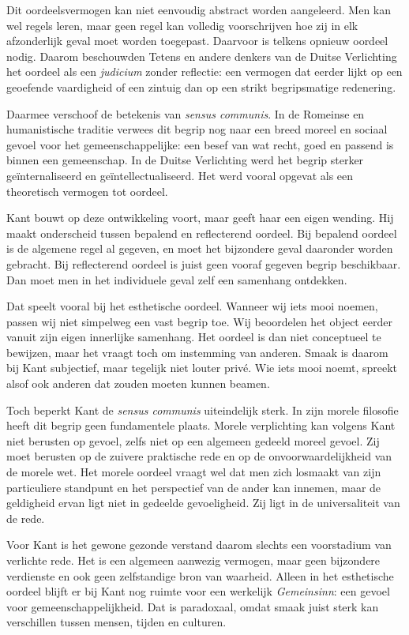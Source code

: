 \documentclass[11pt,twoside,openright]{memoir}
\begin{document}
Dit oordeelsvermogen kan niet eenvoudig abstract worden aangeleerd. Men kan wel regels leren, maar geen regel kan volledig voorschrijven hoe zij in elk afzonderlijk geval moet worden toegepast. Daarvoor is telkens opnieuw oordeel nodig. Daarom beschouwden Tetens en andere denkers van de Duitse Verlichting het oordeel als een \textit{judicium} zonder reflectie: een vermogen dat eerder lijkt op een geoefende vaardigheid of een zintuig dan op een strikt begripsmatige redenering.

Daarmee verschoof de betekenis van \textit{sensus communis}. In de Romeinse en humanistische traditie verwees dit begrip nog naar een breed moreel en sociaal gevoel voor het gemeenschappelijke: een besef van wat recht, goed en passend is binnen een gemeenschap. In de Duitse Verlichting werd het begrip sterker geïnternaliseerd en geïntellectualiseerd. Het werd vooral opgevat als een theoretisch vermogen tot oordeel.

Kant bouwt op deze ontwikkeling voort, maar geeft haar een eigen wending. Hij maakt onderscheid tussen bepalend en reflecterend oordeel. Bij bepalend oordeel is de algemene regel al gegeven, en moet het bijzondere geval daaronder worden gebracht. Bij reflecterend oordeel is juist geen vooraf gegeven begrip beschikbaar. Dan moet men in het individuele geval zelf een samenhang ontdekken.

Dat speelt vooral bij het esthetische oordeel. Wanneer wij iets mooi noemen, passen wij niet simpelweg een vast begrip toe. Wij beoordelen het object eerder vanuit zijn eigen innerlijke samenhang. Het oordeel is dan niet conceptueel te bewijzen, maar het vraagt toch om instemming van anderen. Smaak is daarom bij Kant subjectief, maar tegelijk niet louter privé. Wie iets mooi noemt, spreekt alsof ook anderen dat zouden moeten kunnen beamen.

Toch beperkt Kant de \textit{sensus communis} uiteindelijk sterk. In zijn morele filosofie heeft dit begrip geen fundamentele plaats. Morele verplichting kan volgens Kant niet berusten op gevoel, zelfs niet op een algemeen gedeeld moreel gevoel. Zij moet berusten op de zuivere praktische rede en op de onvoorwaardelijkheid van de morele wet. Het morele oordeel vraagt wel dat men zich losmaakt van zijn particuliere standpunt en het perspectief van de ander kan innemen, maar de geldigheid ervan ligt niet in gedeelde gevoeligheid. Zij ligt in de universaliteit van de rede.

Voor Kant is het gewone gezonde verstand daarom slechts een voorstadium van verlichte rede. Het is een algemeen aanwezig vermogen, maar geen bijzondere verdienste en ook geen zelfstandige bron van waarheid. Alleen in het esthetische oordeel blijft er bij Kant nog ruimte voor een werkelijk \textit{Gemeinsinn}: een gevoel voor gemeenschappelijkheid. Dat is paradoxaal, omdat smaak juist sterk kan verschillen tussen mensen, tijden en culturen.
\end{document}
